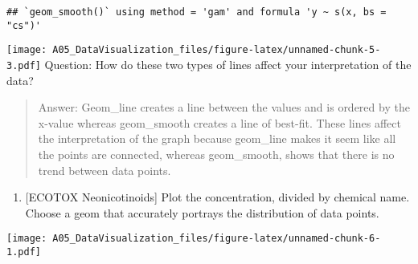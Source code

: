 \documentclass[]{article}
\newenvironment{Shaded}{\begin{snugshade}}{\end{snugshade}}
\newcommand{\KeywordTok}[1]{\textcolor[rgb]{0.13,0.29,0.53}{\textbf{#1}}}
\newcommand{\DataTypeTok}[1]{\textcolor[rgb]{0.13,0.29,0.53}{#1}}
\newcommand{\DecValTok}[1]{\textcolor[rgb]{0.00,0.00,0.81}{#1}}
\newcommand{\StringTok}[1]{\textcolor[rgb]{0.31,0.60,0.02}{#1}}
\newcommand{\CommentTok}[1]{\textcolor[rgb]{0.56,0.35,0.01}{\textit{#1}}}
\newcommand{\OperatorTok}[1]{\textcolor[rgb]{0.81,0.36,0.00}{\textbf{#1}}}
\newcommand{\NormalTok}[1]{#1}
\providecommand{\tightlist}{%
  \setlength{\itemsep}{0pt}\setlength{\parskip}{0pt}}
\begin{document}
\begin{verbatim}
## `geom_smooth()` using method = 'gam' and formula 'y ~ s(x, bs = "cs")'
\end{verbatim}

\texttt{[image: A05\_DataVisualization\_files/figure-latex/unnamed-chunk-5-3.pdf]}
Question: How do these two types of lines affect your interpretation of
the data?

\begin{quote}
Answer: Geom\_line creates a line between the values and is ordered by
the x-value whereas geom\_smooth creates a line of best-fit. These lines
affect the interpretation of the graph because geom\_line makes it seem
like all the points are connected, whereas geom\_smooth, shows that
there is no trend between data points.
\end{quote}

\begin{enumerate}
\def\labelenumi{\arabic{enumi}.}
\setcounter{enumi}{6}
\tightlist
\item
  {[}ECOTOX Neonicotinoids{]} Plot the concentration, divided by
  chemical name. Choose a geom that accurately portrays the distribution
  of data points.
\end{enumerate}

\begin{Shaded}
\end{Shaded}

\texttt{[image: A05\_DataVisualization\_files/figure-latex/unnamed-chunk-6-1.pdf]}
\end{document}
